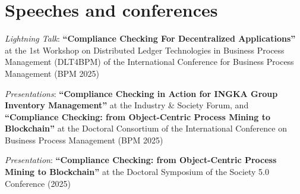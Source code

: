 \section{Speeches and conferences}

    \textit{Lightning Talk}: \textbf{``Compliance Checking For Decentralized Applications''} at the 1st Workshop on Distributed Ledger Technologies in Business Process Management (DLT4BPM) of the International Conference for Business Process Management (BPM 2025)

    \abitspace
    
    \textit{Presentations}: \textbf{``Compliance Checking in Action for INGKA Group Inventory Management''} at the Industry \& Society Forum, and \textbf{``Compliance Checking: from Object-Centric Process Mining to Blockchain''} at the Doctoral Consortium of the International Conference on Business Process Management (BPM 2025)

    \abitspace
    
    \textit{Presentation}: \textbf{``Compliance Checking: from Object-Centric Process Mining to Blockchain''} at the Doctoral Symposium of the Society 5.0 Conference (2025)